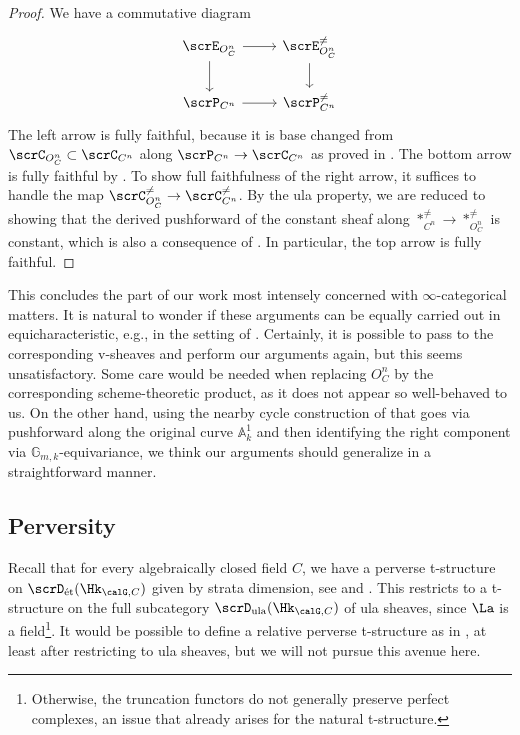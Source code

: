 \documentclass[10pt, reqno]{amsart}
\theoremstyle{plain}
\theoremstyle{definition}
\numberwithin{equation}{section}
\begin{document}
	\begin{proof}
		We have a commutative diagram
		\begin{equation}\begin{tikzcd}
				\scrE_{O_C^n}& \scrE_{O_C^n}^{\neq} \\
				\scrP_{C^n} & \scrP_{C^n}^{\neq}
				\arrow[from=1-2, to=2-2]
				\arrow[from=1-1, to=2-1]
				\arrow[from=1-1, to=1-2]
				\arrow[from=2-1, to=2-2]
			\end{tikzcd}
		\end{equation} 
		The left arrow is fully faithful, because it is base changed from $\scrC_{O_C^n} \subset \scrC_{C^n}$ along $\scrP_{C^n} \to \scrC_{C^n}$ as proved in . The bottom arrow is fully faithful by \cite[Lemma VI.9.3]{FS21}. To show full faithfulness of the right arrow, it suffices to handle the map $\scrC_{O_C^n}^{\neq} \to \scrC_{C^n}^{\neq}$. By the ula property, we are reduced to showing that the derived pushforward of the constant sheaf along $*_{C^n}^{\neq} \to *_{O_C^n}^{\neq}$ is constant, which is also a consequence of . In particular, the top arrow is fully faithful.
	\end{proof}
	
	This concludes the part of our work most intensely concerned with $\infty$-categorical matters. It is natural to wonder if these arguments can be equally carried out in equicharacteristic, e.g., in the setting of \cite{AR}. Certainly, it is possible to pass to the corresponding v-sheaves and perform our arguments again, but this seems unsatisfactory. Some care would be needed when replacing $O_C^n$ by the corresponding scheme-theoretic product, as it does not appear so well-behaved to us. On the other hand, using the nearby cycle construction of \cite[Definition 3.1]{CvdHS24} that goes via pushforward along the original curve $\mathbb{A}^1_k$ and then identifying the right component via $\mathbb{G}_{m,k}$-equivariance, we think our arguments should generalize in a straightforward manner.
	
	\subsection{Perversity}
	
	Recall that for every algebraically closed field $C$, we have a perverse t-structure on $\scrD_{\mathrm{\acute{e}t}}(\Hk_{\calG,C})$ given by strata dimension, see \cite[Section VI.7]{FS21} and \cite{AGLR22}. %
	This restricts to a t-structure on the full subcategory $\scrD_{\mathrm{ula}}(\Hk_{\calG,C})$ of ula sheaves, since $\La$ is a field\footnote{Otherwise, the truncation functors do not generally preserve perfect complexes, an issue that already arises for the natural t-structure.}. It would be possible to define a relative perverse t-structure as in \cite[Definition/Proposition VI.7.1]{FS21}, at least after restricting to ula sheaves, but we will not pursue this avenue here.
	
\end{document}
